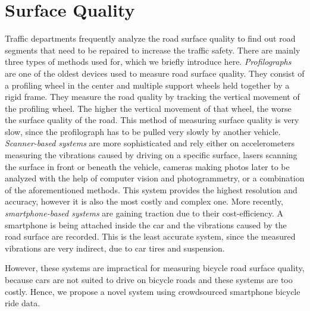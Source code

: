 \section{Surface Quality}
\label{sec:surface_quality_background}
Traffic departments frequently analyze the road surface quality to find out road segments that need to be repaired to increase the traffic safety.
There are mainly three types of methods used for, which we briefly introduce here.
\textit{Profilographs} are one of the oldest devices used to measure road surface quality.
They consist of a profiling wheel in the center and multiple support wheels held together by a rigid frame.
They measure the road quality by tracking the vertical movement of the profiling wheel.
The higher the vertical movement of that wheel, the worse the surface quality of the road.
This method of measuring surface quality is very slow, since the profilograph has to be pulled very slowly by another vehicle.
\textit{Scanner-based systems} are more sophisticated and rely either on accelerometers measuring the vibrations caused by driving on a specific surface, lasers scanning the surface in front or beneath the vehicle, cameras making photos later to be analyzed with the help of computer vision and photogrammetry, or a combination of the aforementioned methods.
This system provides the highest resolution and accuracy, however it is also the most costly and complex one.
More recently, \textit{smartphone-based systems} are gaining traction due to their cost-efficiency.
A smartphone is being attached inside the car and the vibrations caused by the road surface are recorded.
This is the least accurate system, since the measured vibrations are very indirect, due to car tires and suspension.

However, these systems are impractical for measuring bicycle road surface quality, because cars are not suited to drive on bicycle roads and these systems are too costly.
Hence, we propose a novel system using crowdsourced smartphone bicycle ride data.

